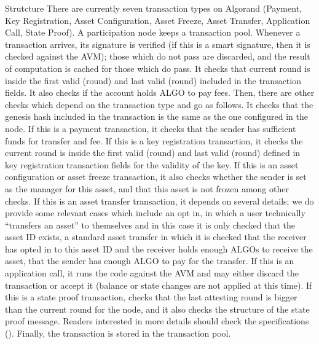 \documentclass[10pt,a4paper]{article}
\begin{document}
\begin{section}{Strutcture}
There are currently seven transaction types on Algorand 
 (Payment, 
 Key Registration, 
 Asset Configuration, 
 Asset Freeze, 
 Asset Transfer, 
 Application Call, 
 State Proof).
A participation node keeps a transaction pool. 
Whenever a transaction arrives, 
  its signature is verified (if this is a smart signature, then it is checked against the AVM); those
    which do not pass are discarded, and the result of computation is cached for those which do pass.
  It checks that current round is inside the first valid (round) and last valid (round) included in the
    transaction fields.
  It also checks if the account holds ALGO to pay fees. Then, there are other checks which depend on the
    transaction type and go as follows.
  It checks that the genesis hash included in the transaction is the same as the one configured in the node.
  If this is a payment transaction, it checks that the sender has sufficient funds for transfer and fee.
  If this is a key  registration transaction, it checks the current round is inside the first valid (round) 
    and last valid (round) defined in key registration transaction fields for the validity of the key.
  If this is an asset configuration or asset freeze transaction, it also checks whether the sender is set 
    as the manager for this asset, and that this asset is not frozen among other checks.
  If this is an asset transfer transaction, it depends on several details; we do provide some relevant 
    cases which include an opt in, in which a user technically ``transfers an asset'' to themselves and in this
    case it is only checked that the asset ID exists, 
    a standard asset transfer in which it is checked that the receiver has opted in to this asset ID and the 
    receiver holds enough ALGOs to receive the asset, that the sender has enough ALGO to pay for the transfer.
  If this is an application call, it runs the code against the AVM and may either discard the transaction or 
    accept it (balance or state changes are not applied at this time).
  If this is a state proof transaction, checks that the last attesting round is bigger than the current 
    round for the node, and it also checks the structure of the state proof message.
  Readers interested in more details should check the specifications (\cite{algorand:specs}).
  Finally, the transaction is stored in the transaction pool. 


\end{section}
\end{document}
